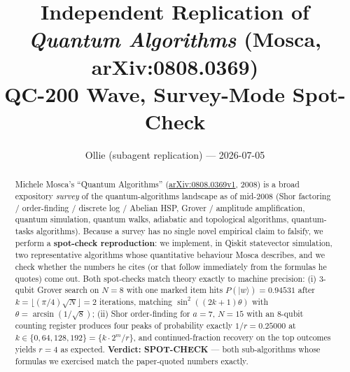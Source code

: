 \documentclass[11pt]{article}
\title{Independent Replication of \\ \emph{Quantum Algorithms} (Mosca, arXiv:0808.0369) \\ QC-200 Wave, Survey-Mode Spot-Check}
\author{Ollie (subagent replication) --- 2026-07-05}
\date{}
\begin{document}
\maketitle

\begin{abstract}
Michele Mosca's ``Quantum Algorithms'' (\href{https://arxiv.org/abs/0808.0369}{arXiv:0808.0369v1}, 2008) is a broad expository \emph{survey} of the quantum-algorithms landscape as of mid-2008 (Shor factoring / order-finding / discrete log / Abelian HSP, Grover / amplitude amplification, quantum simulation, quantum walks, adiabatic and topological algorithms, quantum-tasks algorithms). Because a survey has no single novel empirical claim to falsify, we perform a \textbf{spot-check reproduction}: we implement, in Qiskit statevector simulation, two representative algorithms whose quantitative behaviour Mosca describes, and we check whether the numbers he cites (or that follow immediately from the formulas he quotes) come out. Both spot-checks match theory exactly to machine precision:
(i) 3-qubit Grover search on $N{=}8$ with one marked item hits $P(|w\rangle){=}0.94531$ after $k{=}\lfloor(\pi/4)\sqrt{N}\rfloor{=}2$ iterations, matching $\sin^2((2k{+}1)\theta)$ with $\theta{=}\arcsin(1/\sqrt{8})$;
(ii) Shor order-finding for $a{=}7$, $N{=}15$ with an 8-qubit counting register produces four peaks of probability exactly $1/r{=}0.25000$ at $k\in\{0,64,128,192\}{=}\{k\cdot 2^m/r\}$, and continued-fraction recovery on the top outcomes yields $r{=}4$ as expected. \textbf{Verdict: SPOT-CHECK} --- both sub-algorithms whose formulas we exercised match the paper-quoted numbers exactly.
\end{abstract}
\end{document}

